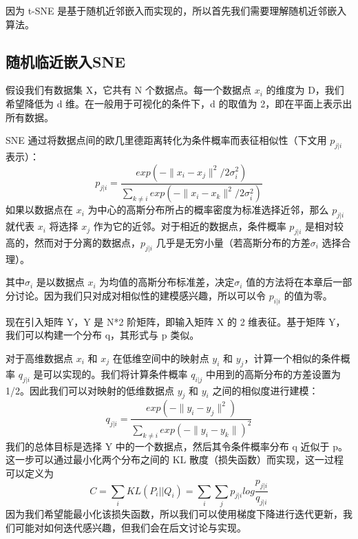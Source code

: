 因为 t-SNE 是基于随机近邻嵌入而实现的，所以首先我们需要理解随机近邻嵌入算法。
\subsection{随机临近嵌入SNE}
假设我们有数据集 X，它共有 N 个数据点。每一个数据点 $x_i$ 的维度为 D，我们希望降低为 d 维。在一般用于可视化的条件下，d 的取值为 2，即在平面上表示出所有数据。

SNE 通过将数据点间的欧几里德距离转化为条件概率而表征相似性（下文用 $p_{j|i}$ 表示）：
\begin{equation}\label{eq:sne1}
	p_{j|i}=\frac{exp(-\|x_i-x_j\|^2/{2\sigma_i^2})}{\sum_{k\neq i}exp(-\|x_i-x_k\|^2/{2\sigma_i^2})}
\end{equation}
如果以数据点在 $x_{i}$ 为中心的高斯分布所占的概率密度为标准选择近邻，那么 $p_{j|i}$ 就代表 $x_{i}$ 将选择 $x_j$ 作为它的近邻。对于相近的数据点，条件概率 $p_{j|i}$ 是相对较高的，然而对于分离的数据点，$p_{j|i}$ 几乎是无穷小量（若高斯分布的方差$\sigma_i$ 选择合理）。

其中$\sigma_i$ 是以数据点 $x_{i}$ 为均值的高斯分布标准差，决定$\sigma_i$ 值的方法将在本章后一部分讨论。因为我们只对成对相似性的建模感兴趣，所以可以令 $p_{i|i}$ 的值为零。

现在引入矩阵 Y，Y 是 N*2 阶矩阵，即输入矩阵 X 的 2 维表征。基于矩阵 Y，我们可以构建一个分布 q，其形式与 p 类似。

对于高维数据点 $x_{i}$ 和 $x_j$ 在低维空间中的映射点 $y_i$ 和 $y_j$，计算一个相似的条件概率 $q_{j|i}$ 是可以实现的。我们将计算条件概率 $q_{i|j}$ 中用到的高斯分布的方差设置为 1/2。因此我们可以对映射的低维数据点 $y_j$ 和 $y_i$ 之间的相似度进行建模：
\begin{equation}\label{eq:sne2}
	q_{j|i}=\frac{exp(-\|y_i-y_j\|^2)}{\sum_{k\neq i}exp(-\|y_i-y_k\|)^2}
\end{equation}
我们的总体目标是选择 Y 中的一个数据点，然后其令条件概率分布 q 近似于 p。这一步可以通过最小化两个分布之间的 KL 散度（损失函数）而实现，这一过程可以定义为\begin{equation}\label{eq:sne3}
	C=\sum_{i}KL(P_i||Q_i)=\sum_i\sum_jp_{j|i}log\frac{p_{j|i}}{q_{j|i}}
\end{equation}
因为我们希望能最小化该损失函数，所以我们可以使用梯度下降进行迭代更新，我们可能对如何迭代感兴趣，但我们会在后文讨论与实现。

